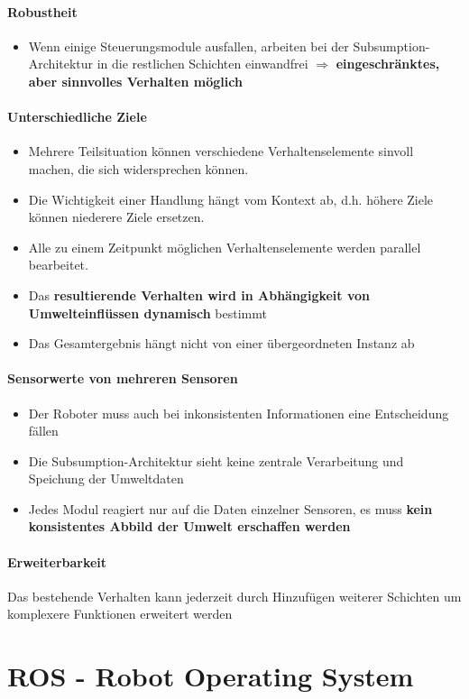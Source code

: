 \paragraph{Robustheit}
\begin{itemize}
	\item Wenn einige Steuerungsmodule ausfallen, arbeiten bei der Subsumption-Architektur in die restlichen Schichten einwandfrei $\Rightarrow$ \textbf{eingeschränktes, aber sinnvolles Verhalten möglich}
\end{itemize}
\paragraph{Unterschiedliche Ziele}
\begin{itemize}
	\item Mehrere Teilsituation können verschiedene Verhaltenselemente sinvoll machen, die sich widersprechen können.
	\item Die Wichtigkeit einer Handlung hängt vom Kontext ab, d.h. höhere Ziele können niederere Ziele ersetzen.
	\item Alle zu einem Zeitpunkt möglichen Verhaltenselemente werden parallel bearbeitet.
	\item Das \textbf{resultierende Verhalten wird in Abhängigkeit von Umwelteinflüssen dynamisch} bestimmt
	\item Das Gesamtergebnis hängt nicht von einer übergeordneten Instanz ab
\end{itemize}
\paragraph{Sensorwerte von mehreren Sensoren}
\begin{itemize}
	\item Der Roboter muss auch bei inkonsistenten Informationen eine Entscheidung fällen
	\item Die Subsumption-Architektur sieht keine zentrale Verarbeitung und Speichung der Umweltdaten
	\item Jedes Modul reagiert nur auf die Daten einzelner Sensoren, es muss \textbf{kein konsistentes Abbild der Umwelt erschaffen werden}
\end{itemize}
\paragraph{Erweiterbarkeit}
Das bestehende Verhalten kann jederzeit durch Hinzufügen weiterer Schichten um komplexere Funktionen erweitert werden
\section{ROS - Robot Operating System}
